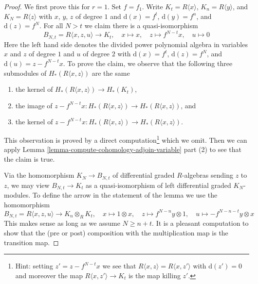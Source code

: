 \begin{proof}
We first prove this for $r = 1$. Set $f = f_1$.
Write $K_t = R\langle x \rangle$,
$K_n = R\langle y \rangle$, and $K_N = R\langle z \rangle$
with $x$, $y$, $z$ of degree $1$ and
$\text{d}(x) = f^t$, $\text{d}(y) = f^n$, and
$\text{d}(z) = f^N$. For all $N > t$ we claim there is a quasi-isomorphism
$$
B_{N, t} = R\langle x, z, u \rangle
\longrightarrow
K_t,\quad
x \mapsto x,\quad
z \mapsto f^{N - t}x,\quad
u \mapsto 0
$$
Here the left hand side denotes the divided power polynomial algebra
in variables $x$ and $z$ of degree $1$ and $u$ of degree $2$ with
$\text{d}(x) = f^t$, $\text{d}(z) = f^N$, and
$\text{d}(u) = z - f^{N - t}x$. To prove the claim,
we observe that the following three submodules of
$H_*(R\langle x, z\rangle)$ are the same
\begin{enumerate}
\item the kernel of $H_*(R\langle x, z\rangle) \to H_*(K_t)$,
\item the image of
$z - f^{N - t}x : H_*(R\langle x, z\rangle) \to H_*(R\langle x, z\rangle)$, and
\item the kernel of
$z - f^{N - t}x : H_*(R\langle x, z\rangle) \to H_*(R\langle x, z\rangle)$.
\end{enumerate}
This observation is proved by a direct computation\footnote{Hint: setting
$z' = z - f^{N - t}x$ we see that
$R\langle x, z\rangle = R\langle x, z'\rangle$ with $\text{d}(z') = 0$
and moreover the map $R\langle x, z'\rangle \to K_t$ is
the map killing $z'$.} which we omit. Then we can
apply Lemma \ref{lemma-compute-cohomology-adjoin-variable} part (2)
to see that the claim is true.

\medskip\noindent
Via the homomorphism $K_N \to B_{N, t}$ of differential graded $R$-algebras
sending $z$ to $z$, we may view $B_{N, t} \to K_t$ as a quasi-isomorphism of
left differential graded $K_N$-modules. To define the arrow in the statement
of the lemma we use the homomorphism
$$
B_{N, t} = R\langle x, z, u \rangle \to K_n \otimes_R K_t,\quad
x \mapsto 1 \otimes x,\quad
z \mapsto f^{N - n}y \otimes 1,\quad
u \mapsto - f^{N - n - t}y \otimes x
$$
This makes sense as long as we assume $N \geq n + t$. It is a
pleasant computation to show that the (pre or post) composition with
the multiplication map is the transition map.


\end{proof}
